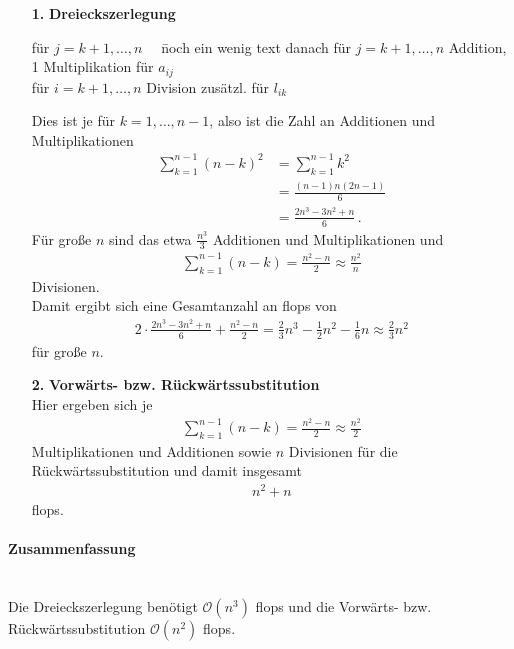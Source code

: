 \documentclass[ngerman,fontsize=11pt, paper=a4, parskip=half, titlepage=true, toc=bib]{scrbook}
\begin{document}
\begin{enumerate}
	\item[\textbf{1.}] \textbf{Dreieckszerlegung} 
			\begin{tabbing}
				für $j=k+1, \dots, n\quad$ \= noch ein wenig text danach \kill
				für $j=k+1, \dots, n$  Addition, 1 Multiplikation für $a_{ij}$ \\
				für $i=k+1, \dots, n$  Division zusätzl. für $ l_{ik}$
			\end{tabbing}
			Dies ist je für $k=1, \dots, n-1$, also ist die Zahl an Additionen und Multiplikationen
			\begin{align*}
				\sum_{k=1}^{n-1}(n-k)^2 &= \sum_{k=1}^{n-1}k^2 \\
				 											&= \frac{(n-1)n(2n-1)}{6} \\
				 									        &= \frac{2n^3-3n^2+n}{6}\, .
			\end{align*}
			Für große $n$ sind das etwa $\frac{n^3}{3}$ Additionen und Multiplikationen und
			\begin{gather*}
				\sum_{k=1}^{n-1} (n-k) = \frac{n^2-n}{2} \approx \frac{n^2}{n}
			\end{gather*}
			Divisionen. \\
			Damit ergibt sich eine Gesamtanzahl an flops von
			\begin{gather*}
				2\cdot\frac{2n^3-3n^2+n}{6} + \frac{n^2-n}{2} 
					= \frac{2}{3} n^3 - \frac{1}{2}n^2 - \frac{1}{6} n
					 \approx \frac{2}{3}n^2
			\end{gather*}
			für große $n$.
			
	\item[\textbf{2.}] \textbf{Vorwärts- bzw. Rückwärtssubstitution}  \\
			Hier ergeben sich je
			\begin{gather*}
				\sum_{k=1}^{n-1} (n-k) = \frac{n^2-n}{2} \approx \frac{n^2}{2}
			\end{gather*}
			Multiplikationen und Additionen sowie 
			$n$ Divisionen für die Rückwärtssubstitution und damit insgesamt \begin{gather*}n^2+n\end{gather*} flops.	
\end{enumerate}
\paragraph{Zusammenfassung}~ \\
Die Dreieckszerlegung benötigt $\mathcal{O}(n^3)$ flops und 
die Vorwärts- bzw. Rückwärtssubstitution $\mathcal{O}(n^2)$ flops.
\end{document}
